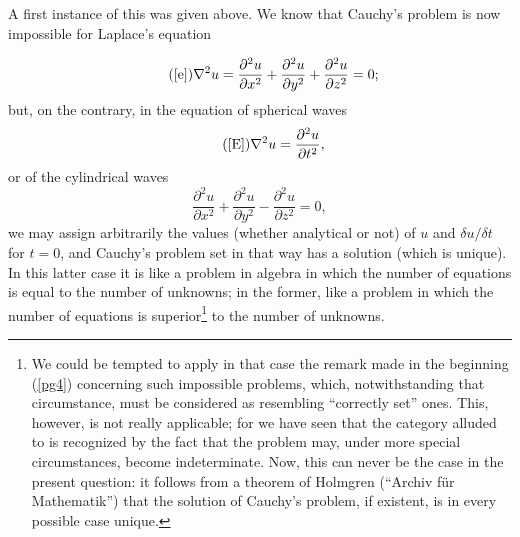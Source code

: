 \documentclass[12pt,oneside]{book}
\begin{document}
A first instance of this was given above. We know that Cauchy's problem is now
impossible for Laplace's equation

\begin{equation}
    \tag{\ref{e}}
    \nabla^2u=\frac{\partial^2u}{\partial x^2}+\frac{\partial^2u}{\partial y^2}+\frac{\partial^2u}{\partial z^2}=0;
\end{equation}
but, on the contrary, in the equation of spherical waves
\begin{equation}
    \tag{\ref{E}}
    \nabla^2u=\frac{\partial^2u}{\partial t^2},
\end{equation}
or of the cylindrical waves
\begin{equation}
    \tag{E'}\label{E'}
    \frac{\partial^2u}{\partial x^2}+\frac{\partial^2u}{\partial y^2}-\frac{\partial^2u}{\partial z^2}=0,
\end{equation}
we may assign arbitrarily the values (whether analytical or not) of $u$ and
$\delta u/\delta t$ for $t=0$, and Cauchy's problem set in that way has a
solution (which is unique). In this latter case it is like a problem in algebra
in which the number of equations is equal to the number of unknowns; in the
former, like a problem in which the number of equations is superior\footnote{We
could be tempted to apply in that case the remark made in the beginning
(\ref{pg4}) concerning such impossible problems, which, notwithstanding that
circumstance, must be considered as resembling ``correctly set'' ones. This,
however, is not really applicable; for we have seen that the category alluded to
is recognized by the fact that the problem may, under more special
circumstances, become indeterminate. Now, this can never be the case in the
present question: it follows from a theorem of Holmgren (``Archiv f\"ur
Mathematik'') that the solution of Cauchy's problem, if existent, is in every
possible case unique.} to the number of unknowns. \par
\end{document}
